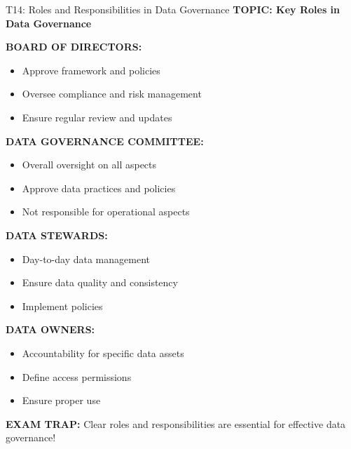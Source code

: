 \documentclass[8pt]{beamer}
\begin{document}
	\begin{frame}{T14: Roles and Responsibilities in Data Governance}
		\fontsize{6.5}{7.5}\selectfont
		\textbf{TOPIC: Key Roles in Data Governance}
		
		\vspace{0.1cm}
		\textbf{BOARD OF DIRECTORS:}
		\begin{itemize}
			\item Approve framework and policies
			\item Oversee compliance and risk management
			\item Ensure regular review and updates
		\end{itemize}
		
		\vspace{0.1cm}
		\textbf{DATA GOVERNANCE COMMITTEE:}
		\begin{itemize}
			\item Overall oversight on all aspects
			\item Approve data practices and policies
			\item Not responsible for operational aspects
		\end{itemize}
		
		\vspace{0.1cm}
		\textbf{DATA STEWARDS:}
		\begin{itemize}
			\item Day-to-day data management
			\item Ensure data quality and consistency
			\item Implement policies
		\end{itemize}
		
		\vspace{0.1cm}
		\textbf{DATA OWNERS:}
		\begin{itemize}
			\item Accountability for specific data assets
			\item Define access permissions
			\item Ensure proper use
		\end{itemize}
		
		\textcolor{myred}{\textbf{EXAM TRAP:}} Clear roles and responsibilities are \textcolor{myblue}{essential for effective data governance}!
	\end{frame}
	
\end{document}

